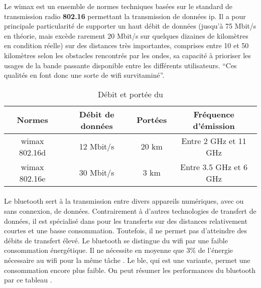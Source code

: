 Le \gls{wimax} est un ensemble de normes techniques basées sur le standard de transmission radio \textbf{802.16}
permettant la transmission de données \gls{ip}.\newline
Il a pour principale particularité de supporter un haut débit de données (jusqu’à 75 Mbit/s en théorie, mais
excède rarement 20 Mbit/s sur quelques dizaines de kilomètres en condition réelle) sur des distances très importantes,
comprises entre 10 et 50 kilomètres selon les obstacles rencontrés par les ondes, sa capacité à prioriser les usages de
la bande passante disponible entre les différents utilisateurs. \enquote{Ces qualités en font donc une sorte
    de \gls{wifi} survitaminé}{\cite{wimax}}.

\begin{table}[H]
    \centering
    \begin{tabular}{|c|c|c|c|}
        \hline
        \rowcolor{tableColorDark} Normes & Débit de données & Portées & Fréquence d'émission   \\
        \hline

        \gls{wimax} 802.16d              & 12 Mbit/s        & 20 km   & Entre 2 GHz et 11 GHz  \\\hline
        \gls{wimax} 802.16e              & 30 Mbit/s        & 3 km    & Entre 3.5 GHz et 6 GHz \\\hline
    \end{tabular}
    \label{tab:debitPorteeWimax}
    \caption{Débit et portée du }
    \nocite{debitPortee}
\end{table}


\paragraph{}
\label{sec:bluetooth}

Le \gls{bluetooth} sert à la transmission entre divers appareils numériques, avec ou sans connexion,
de données. Contrairement à d'autres technologies de transfert de données, il est
spécialisé dans pour les transferts sur des distances relativement courtes et une basse
consommation. Toutefois, il ne permet pas d'atteindre des débits de transfert élevé.\newline
Le \gls{bluetooth} se distingue du \gls{wifi} par une faible consommation énergétique. Il
ne nécessite en moyenne que 3\% de l'énergie nécessaire au \gls{wifi} pour la même tâche \cite{bluetoothConsumption}.
Le \gls{ble}, qui est une variante, permet une consommation encore plus faible.\newline
On peut résumer les performances du \gls{bluetooth} par ce tableau \cite{debitPortee, ble}.

